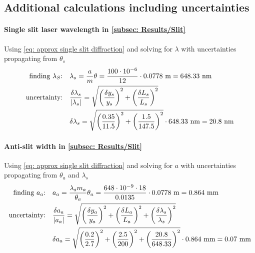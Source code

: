 \documentclass{emulateapj}
\begin{document}


\clearpage
\begin{appendices}
\section{Additional calculations including uncertainties}
\label{asec: Calculations}
\paragraph{Single slit laser wavelength in \cref{subsec: Results/Slit}} Using \cref{eq: approx single slit diffraction} and solving for $\lambda$ with uncertainties propagating from $\theta_s$
\begin{align*}
\qq*{finding $\lambda_S$:} & \lambda_s = \frac{a}{m}\theta = \frac{100 \cdot 10^{-6}}{12}\cdot 0.0778 \text{ m}= 648.33 \text{ nm}
\\
\qq*{uncertainty:} & \frac{\delta \lambda_s}{\abs{\lambda_s}} = \sqrt{ \qty(\frac{\delta y_s}{y_s}   )^2+\qty(\frac{\delta L_s}{L_s})^2 }
\\
&\delta \lambda_s =\sqrt{ \qty(\frac{0.35}{11.5}   )^2+\qty(\frac{1.5}{147.5})^2 }\cdot 648.33\text{ nm} = 20.8 \text{ nm}
\end{align*}

\paragraph{Anti-slit width in \cref{subsec: Results/Slit}} Using \cref{eq: approx single slit diffraction} and solving for $a$ with uncertainties propagating from $\theta_a$ and $\lambda_s$
\begin{align*}
\qq*{finding $a_a$:} & a_a = \frac{\lambda_s m_a}{\theta_a}\theta_a = \frac{648 \cdot 10^{-9} \cdot18}{0.0135}\cdot 0.0778 \text{ m}= 0.864 \text{ mm}
\\
\qq*{uncertainty:} & \frac{\delta a_a}{\abs{a_a}} = \sqrt{ \qty(\frac{\delta y_a}{y_a})^2+\qty(\frac{\delta L_a}{L_a})^2+\qty(\frac{\delta \lambda_s}{\lambda_s})^2 }
\\
& \delta a_a = \sqrt{ \qty(\frac{0.2}{2.7})^2+\qty(\frac{2.5}{200})^2+\qty(\frac{20.8}{648.33})^2} \cdot 0.864 \text{ mm} = 0.07 \text{ mm}
\end{align*}


\end{appendices}
\end{document}
